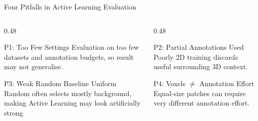 \documentclass[aspectratio=169,11pt]{beamer}
\begin{document}
\begin{frame}{Four Pitfalls in Active Learning Evaluation}

\begin{columns}[T]

\begin{column}{0.48\textwidth}

\begin{block}{P1: Too Few Settings}
\small
Evaluation on too few datasets and annotation budgets, so result may not generalise.
\end{block}

\vspace{0.25cm}

\begin{block}{P3: Weak Random Baseline}
\small
Uniform Random often selects mostly background, making Active Learning may look artificially strong
\end{block}

\end{column}

\begin{column}{0.48\textwidth}

\begin{block}{P2: Partial Annotations Used Poorly}
\small
2D training discards useful surrounding 3D context.
\end{block}

\vspace{0.25cm}

\begin{block}{P4: Voxels $\neq$ Annotation Effort}
\small
Equal-size patches can require very different annotation effort.
\end{block}

\end{column}

\end{columns}

\end{frame}
\end{document}
